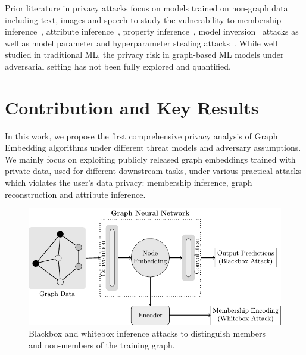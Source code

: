 Prior literature in privacy attacks focus on models trained on non-graph data including text, images and speech to study the vulnerability to membership inference~\cite{ndss19salem,membershipinf}, attribute inference~\cite{attributeinf,attributeinf2}, property inference~\cite{propertyinf}, model inversion~\cite{modelinversion} attacks as well as model parameter and hyperparameter stealing attacks~\cite{timing,stealml,8418595}.
While well studied in traditional ML, the privacy risk in graph-based ML models under adversarial setting has not been fully explored and quantified. %


\section{Contribution and Key Results}
\label{contribution}

In this work, we propose the first comprehensive privacy analysis of Graph Embedding algorithms under different threat models and adversary assumptions.
We mainly focus on exploiting publicly released graph embeddings trained with private data, used for different downstream tasks, under various practical attacks which violates the user's data privacy: membership inference, graph reconstruction and attribute inference.

\begin{figure}[!htb]
\centering
\includegraphics[width=0.6\linewidth]{./figures/Attacks/MIA.pdf}
\caption{Blackbox and whitebox inference attacks to distinguish members and non-members of the training graph.}
\label{mia}
\end{figure}

